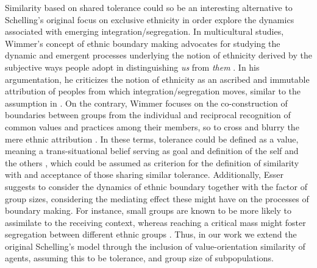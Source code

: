 \documentclass{ws-acs}
\begin{document}
Similarity based on shared tolerance could so be an interesting alternative to Schelling's original focus on exclusive ethnicity in order explore the dynamics associated with emerging integration/segregation. In multicultural studies, Wimmer's concept of ethnic boundary making \cite{wimmer09} advocates  for  studying the dynamic and emergent processes underlying the notion of ethnicity derived by the subjective ways people adopt in distinguishing  {\it us} from {\it them} \cite[p.~250]{wimmer09}. In his argumentation, he criticizes the notion of ethnicity as an ascribed and immutable attribution of peoples from which integration/segregation moves, similar to the assumption in \cite{schelling69}. On the contrary, Wimmer focuses on the co-construction of boundaries between groups from the individual and reciprocal recognition of common values and practices among their members, so to cross and blurry the mere ethnic attribution \cite{wimmer13}. In these terms, tolerance could be defined as a value, meaning a trans-situational belief serving  as goal and definition of the self and the others \cite{schwartz2012}, which could be assumed as criterion for the definition of similarity with and acceptance of those sharing similar tolerance. Additionally, Esser \cite{Esser2010} suggests to consider the dynamics of ethnic boundary together with the factor of group sizes, considering the mediating effect these might have on the processes of boundary making. For instance, small groups are known to be more likely to assimilate to the receiving context, whereas reaching a critical mass might foster segregation between different ethnic groups \cite{Esser2010}. Thus, in our work we extend the original Schelling's model through the inclusion of value-orientation similarity of agents, assuming this to be tolerance, and group size of subpopulations.
\end{document}
